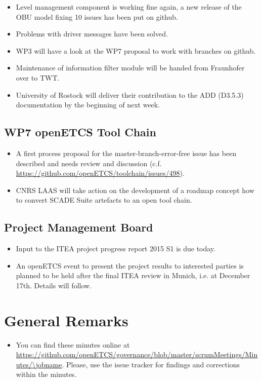 \documentclass[a4paper, 11pt]{article}
\begin{document}
\begin{itemize}
\item Level management component is working fine again, a new release of the OBU model fixing 10 issues has been put on github.
\item Problems with driver messages have been solved.
\item WP3 will have a look at the WP7 proposal to work with branches on github.
\item Maintenance of information filter module will be handed from Fraunhofer over to TWT.
\item University of Rostock will deliver their contribution to the ADD (D3.5.3) documentation by the beginning of next week.
\end{itemize}

\subsection{WP7 openETCS Tool Chain}

\begin{itemize}
\item A first process proposal for the master-branch-error-free issue has been described and needs review and discussion (c.f. \url{https://github.com/openETCS/toolchain/issues/498}).
\item CNRS LAAS will take action on the development of a roadmap concept how to convert SCADE Suite artefacts to an open tool chain.
\end{itemize}

\subsection{Project Management Board}

\begin{itemize}
\item Input to the ITEA project progress report 2015 S1 is due today.
\item An openETCS event to present the project results to interested parties is planned to be held after the final ITEA review in Munich, i.e. at December 17th. Details will follow.
\end{itemize}


\section{General Remarks}

\begin{itemize}
\item You can find these minutes online at \url{https://github.com/openETCS/governance/blob/master/scrumMeetings/Minutes/\jobname}. Please, use the issue tracker for findings and corrections within the minutes.
\end{itemize}
\end{document}
